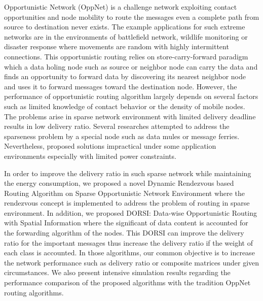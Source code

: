 %

Opportunistic Network (OppNet) is a challenge network exploiting contact opportunities and node mobility to route the messages even a complete path from source to destination never exists.
The example applications for such extreme networks are in the environments of battlefield network, wildlife monitoring or disaster response  where movements are random with highly intermittent connections. 
This opportunistic routing relies on store-carry-forward paradigm which a data holing node such as source or neighbor node can carry the data and finds an opportunity to forward data by discovering its nearest neighbor node and uses it to forward messages toward the destination node.
However, the performance of opportunistic routing algorithm largely depends on several factors such as limited knowledge of contact behavior or the density of mobile nodes.
The problems arise in sparse network environment with limited delivery deadline results in low delivery ratio.
Several researches attempted to address the sparseness problem by a special node such as data mules or message ferries.
Nevertheless, proposed solutions impractical under some application environments especially with limited power constraints.

In order to improve the delivery ratio in such sparse network while maintaining the energy consumption, we proposed a novel Dynamic Rendezvous based Routing Algorithm on Sparse Opportunistic Network Environment where the rendezvous concept is implemented to address the problem of routing in sparse environment.
In addition, we proposed DORSI: Data-wise Opportunistic Routing with Spatial Information where the significant of data content is accounted for the forwarding algorithm of the nodes. 
This DORSI can improve the delivery ratio for the important messages thus increase the delivery ratio if the weight of each class is accounted.
In those algorithms, our common objective is to increase the network performance such as delivery ratio or composite matrices under given circumstances.
We also present intensive simulation results regarding the performance comparison of the proposed algorithms with the tradition OppNet routing algorithms.


